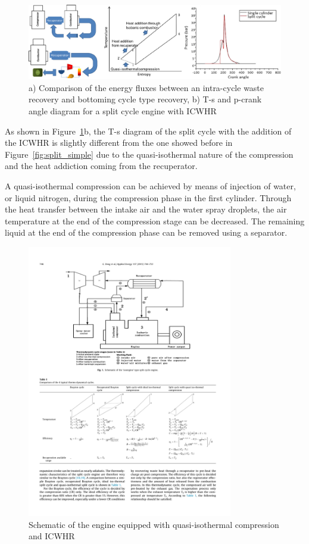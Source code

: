 \begin{figure}[ht]
  \centering
  \includegraphics[width=\textwidth]{figures/review/ICWHR_vs_ORC.pdf}
  \caption{a) Comparison of the energy fluxes between an intra-cycle waste recovery and bottoming cycle type recovery, b) T-s and p-crank angle diagram for a split cycle engine with ICWHR\label{fig:ICWHR_vs_ORC} }
\end{figure}

As shown in Figure~\ref{fig:ICWHR_vs_ORC}b, the T-s diagram of the split cycle with the addition of the ICWHR is slightly different from the one showed before in Figure~\ref{fig:split_simple} due to the quasi-isothermal nature of the compression and the heat addiction coming from the recuperator.

A quasi-isothermal compression can be achieved by means of injection of water, or liquid nitrogen, during the compression phase in the first cylinder. Through the heat transfer between the intake air and the water spray droplets, the air temperature at the end of the compression stage can be decreased. The remaining liquid at the end of the compression phase can be removed using a separator.

\begin{figure}[ht]
  \centering
  \includegraphics[width=0.8\textwidth]{figures/review/split_ICWHR_layout.pdf}
  \caption{Schematic of the engine equipped with quasi-isothermal compression and ICWHR\label{fig:split_ICWHR_layout} }
\end{figure}


